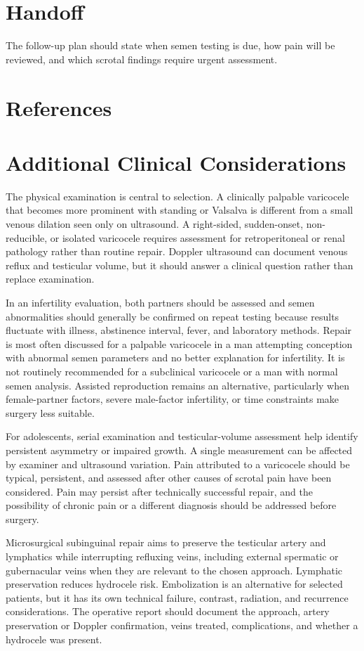 \section*{Handoff}
The follow-up plan should state when semen testing is due, how pain will be reviewed, and which scrotal findings require urgent assessment.

\section*{References}

\section*{Additional Clinical Considerations}
The physical examination is central to selection. A clinically palpable varicocele that becomes more prominent with standing or Valsalva is different from a small venous dilation seen only on ultrasound. A right-sided, sudden-onset, non-reducible, or isolated varicocele requires assessment for retroperitoneal or renal pathology rather than routine repair. Doppler ultrasound can document venous reflux and testicular volume, but it should answer a clinical question rather than replace examination.

In an infertility evaluation, both partners should be assessed and semen abnormalities should generally be confirmed on repeat testing because results fluctuate with illness, abstinence interval, fever, and laboratory methods. Repair is most often discussed for a palpable varicocele in a man attempting conception with abnormal semen parameters and no better explanation for infertility. It is not routinely recommended for a subclinical varicocele or a man with normal semen analysis. Assisted reproduction remains an alternative, particularly when female-partner factors, severe male-factor infertility, or time constraints make surgery less suitable.

For adolescents, serial examination and testicular-volume assessment help identify persistent asymmetry or impaired growth. A single measurement can be affected by examiner and ultrasound variation. Pain attributed to a varicocele should be typical, persistent, and assessed after other causes of scrotal pain have been considered. Pain may persist after technically successful repair, and the possibility of chronic pain or a different diagnosis should be addressed before surgery.

Microsurgical subinguinal repair aims to preserve the testicular artery and lymphatics while interrupting refluxing veins, including external spermatic or gubernacular veins when they are relevant to the chosen approach. Lymphatic preservation reduces hydrocele risk. Embolization is an alternative for selected patients, but it has its own technical failure, contrast, radiation, and recurrence considerations. The operative report should document the approach, artery preservation or Doppler confirmation, veins treated, complications, and whether a hydrocele was present.

